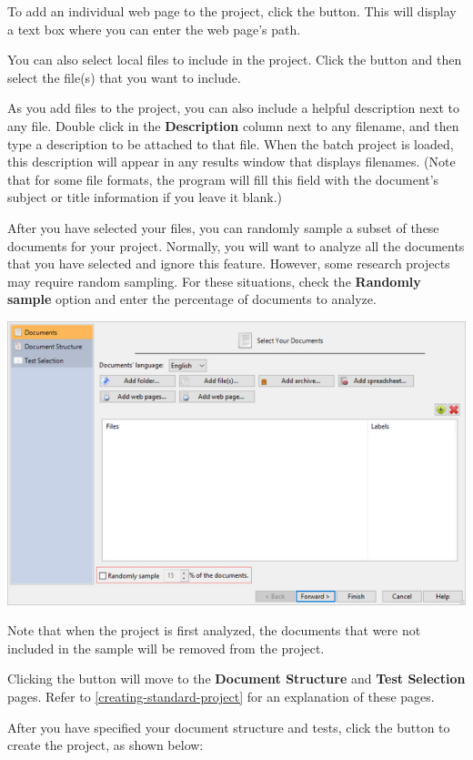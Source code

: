 \documentclass[
]{book}
\theoremstyle{definition}
\theoremstyle{definition}
\theoremstyle{definition}
\theoremstyle{definition}
\theoremstyle{remark}
\begin{document}
To add an individual web page to the project, click the  button. This will display a text box where you can enter the web page's path.

You can also select local files to include in the project. Click the  button and then select the file(s) that you want to include.

As you add files to the project, you can also include a helpful description next to any file. Double click in the \textbf{Description} column next to any filename, and then type a description to be attached to that file. When the batch project is loaded, this description will appear in any results window that displays filenames. (Note that for some file formats, the program will fill this field with the document's subject or title information if you leave it blank.)

After you have selected your files, you can randomly sample a subset of these documents for your project. Normally, you will want to analyze all the documents that you have selected and ignore this feature. However, some research projects may require random sampling. For these situations, check the \textbf{Randomly sample} option and enter the percentage of documents to analyze.

\includegraphics{Images/randomsample.png}

Note that when the project is first analyzed, the documents that were not included in the sample will be removed from the project.

Clicking the  button will move to the \textbf{Document Structure} and \textbf{Test Selection} pages. Refer to \ref{creating-standard-project} for an explanation of these pages.

After you have specified your document structure and tests, click the  button to create the project, as shown below:
\end{document}
